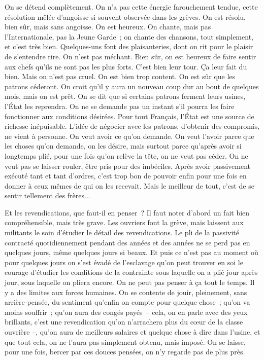 \documentclass[french,twoside]{book} %
\begin{document}
On se détend complètement. On n'a pas cette énergie farouchement tendue, cette résolution mêlée d'angoisse si souvent observée dans les grèves. On est résolu, bien sûr, mais sans angoisse. On est heureux. On chante, mais pas l'Internationale, pas la Jeune Garde ; on chante des chansons, tout simplement, et c'est très bien. Quelques-uns font des plaisanteries, dont on rit pour le plaisir de s'entendre rire. On n'est pas méchant. Bien sûr, on est heureux de faire sentir aux chefs qu'ils ne sont pas les plus forts. C'est bien leur tour. Ça leur fait du bien. Mais on n'est pas cruel. On est bien trop content. On est sûr que les patrons céderont. On croit qu'il y aura un nouveau coup dur au bout de quelques mois, mais on est prêt. On se dit que si certains patrons ferment leurs usines, l'État les reprendra. On ne se demande pas un instant s'il pourra les faire fonctionner aux conditions désirées. Pour tout Français, l'État est une source de richesse inépuisable. L'idée de négocier avec les patrons, d'obtenir des compromis, ne vient à personne. On veut avoir ce qu'on demande. On veut l'avoir parce que les choses qu'on demande, on les désire, mais surtout parce qu'après avoir si longtemps plié, pour une fois qu'on relève la tête, on ne veut pas céder. On ne veut pas se laisser rouler, être pris pour des imbéciles. Après avoir passivement exécuté tant et tant d'ordres, c'est trop bon de pouvoir enfin pour une fois en donner à ceux mêmes de qui on les recevait. Mais le meilleur de tout, c'est de se sentir tellement des frères...\par
Et les revendications, que faut-il en penser ? Il faut noter d'abord un fait bien compréhensible, mais très grave. Les ouvriers font la grève, mais laissent aux militants le soin d'étudier le détail des revendications. Le pli de la passivité contracté quotidiennement pendant des années et des années ne se perd pas en quelques jours, même quelques jours si beaux. Et puis ce n'est pas au moment où pour quelques jours on s'est évadé de l'esclavage qu'on peut trouver en soi le courage d'étudier les conditions de la contrainte sous laquelle on a plié jour après jour, sous laquelle on pliera encore. On ne peut pas penser à ça tout le temps. Il y a des limites aux forces humaines. On se contente de jouir, pleinement, sans arrière-pensée, du sentiment qu'enfin on compte pour quelque chose ; qu'on va moins souffrir ; qu'on aura des congés payés – cela, on en parle avec des yeux brillants, c'est une revendication qu'on n'arrachera plus du cœur de la classe ouvrière –, qu'on aura de meilleurs salaires et quelque chose à dire dans l'usine, et que tout cela, on ne l'aura pas simplement obtenu, mais imposé. On se laisse, pour une fois, bercer par ces douces pensées, on n'y regarde pas de plus près.\par
\end{document}
